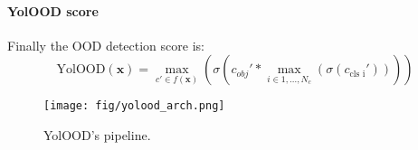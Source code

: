 \paragraph{YolOOD score}
Finally the OOD detection score is:
\begin{equation}
\text{YolOOD}(\mathbf{x}) = 
\max_{c' \in f(\mathbf{x})}(\sigma(c_{obj}' * \max_{i \in 1, \dots, N_c}(\sigma(c_{\text{cls i}}'))))
\end{equation}

\begin{figure}[h!]
\centering
\texttt{[image: fig/yolood\_arch.png]}
\caption{YolOOD's pipeline.}
\label{fig:yolo}
\end{figure}

